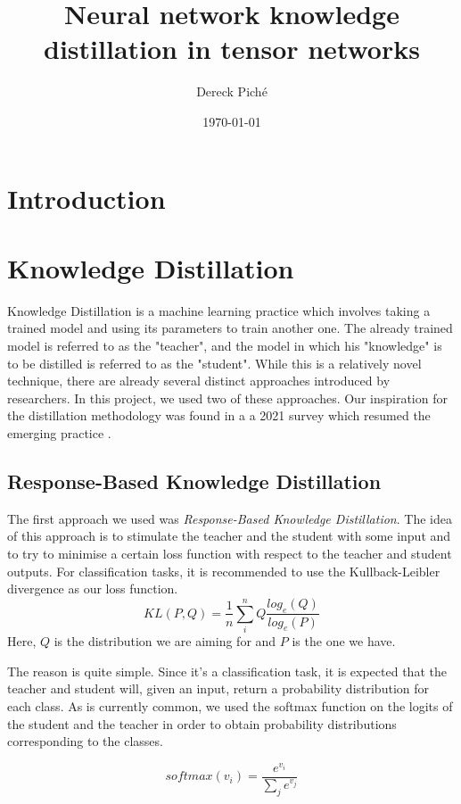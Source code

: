 \documentclass{article}
\title{Neural network knowledge distillation in tensor networks}
\author{Dereck Piché}
\date{\today}
\theoremstyle{definition}
\theoremstyle{definition}
\begin{document}
\maketitle


\section{Introduction}



\section{Knowledge Distillation}
Knowledge Distillation is a machine learning practice which involves
taking a trained model and using its parameters to train another one.
The already trained model is referred to as the "teacher", and 
the model in which his "knowledge" is to be distilled is referred to as
the "student". While this is a relatively novel technique, there are 
already several distinct approaches introduced by researchers.
In this project, we used two of these approaches. Our inspiration for the distillation 
methodology was found in a a 2021 survey which resumed the emerging 
practice \cite{Gou_2021}.

\subsection{Response-Based Knowledge Distillation}
The first approach we used was \emph{Response-Based Knowledge Distillation}. The idea of this approach is to stimulate the teacher and the student with some input and to try to minimise a certain loss function with respect to the teacher and student outputs. For classification tasks, it is recommended to use the Kullback-Leibler divergence as our loss function. 
\begin{equation}
    KL(P, Q) = \frac{1}{n} \sum_i^n Q \frac{log_e(Q)}{log_e(P)}
\end{equation}
Here, $Q$ is the distribution we are aiming for and $P$ is the one we have.

The reason is quite simple. Since it's a classification task, it is expected that the teacher and student will, given an input, return a probability distribution for each class. As is currently common, we used the softmax function on the logits of the student and the teacher in order to obtain probability distributions corresponding to the classes. 

\begin{equation}
    softmax(v_i) = \frac{e^{v_i}}{\sum_{j}{e^{v_j}}}
\end{equation}
\end{document}
